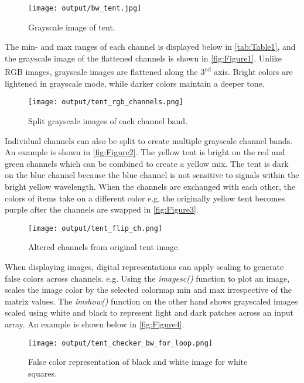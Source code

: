 \documentclass[12pt]{report}
\begin{document}
\begin{enumerate}
    \begin{figure}[ht!]
        \texttt{[image: output/bw\_tent.jpg]}
        \centering
        \caption{Grayscale image of tent.}
        \label{fig:Figure1}
    \end{figure}

    \newpage
    The min- and max ranges of each channel is displayed below in \autoref{tab:Table1}, and 
    the grayscale image of the flattened channels is shown in \autoref{fig:Figure1}. Unlike RGB
    images, grayscale images are flattened along the 3\textsuperscript{rd} axis. Bright colors
    are lightened in grayscale mode, while darker colors maintain a deeper tone. 

    \begin{figure}[ht!]
        \texttt{[image: output/tent\_rgb\_channels.png]}
        \centering
        \caption{Split grayscale images of each channel band.}
        \label{fig:Figure2}
    \end{figure}

    Individual channels can also be split to create multiple grayscale channel bands. An
    example is shown in \autoref{fig:Figure2}. The yellow tent is bright on the red and 
    green channels which can be combined to create a yellow mix. The tent is dark on the 
    blue channel because the blue channel is not sensitive to signals within the bright 
    yellow wavelength. When the channels are exchanged with each other, the colors of items
    take on a different color e.g. the originally yellow tent becomes purple after the 
    channels are swapped in \autoref{fig:Figure3}.

    \begin{figure}[ht!]
        \texttt{[image: output/tent\_flip\_ch.png]}
        \centering
        \caption{Altered channels from original tent image.}
        \label{fig:Figure3}
    \end{figure}

    When displaying images, digital representations can apply scaling to generate false colors
    across channels. e.g. Using the \emph{imagesc()} function to plot an image, scales the image 
    color by the selected colormap min and max irrespective of the matrix values. The \emph{imshow()}
    function on the other hand shows grayscaled images scaled using white and black to represent 
    light and dark patches across an input array. An example is shown below in \autoref{fig:Figure4}.

    \newpage
    \begin{figure}[ht!]
        \texttt{[image: output/tent\_checker\_bw\_for\_loop.png]}
        \centering
        \caption{False color representation of black and white image for white squares.}
        \label{fig:Figure4}
    \end{figure}


\end{enumerate}
\end{document}

